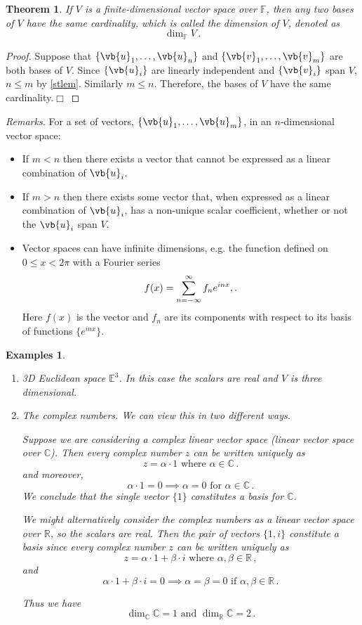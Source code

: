 \documentclass{article}
\theoremstyle{plain}\theoremheaderfont{\normalfont\itshape}\theorembodyfont{\rmfamily}\theoremseparator{.}\newtheorem*{rem}{Remark}\newtheorem*{ex}{Example}\newtheorem*{proof}{Proof}\newtheorem*{altp}{Alternative proof}
\theoremstyle{plain}\theoremheaderfont{\normalfont\bfseries}\theorembodyfont{\rmfamily}\theoremseparator{.}\newtheorem{thm}{Theorem}[section]\newtheorem{lem}[thm]{Lemma}\newtheorem{prop}[thm]{Proposition}\newtheorem*{cor}{Corollary}\newtheorem{defn}[thm]{Definition}\newtheorem{clm}[thm]{Claim}\newtheorem{clminproof}{Claim}
\theoremstyle{break}\theoremheaderfont{\normalfont\itshape}\theorembodyfont{\rmfamily}\theoremseparator{.\medskip}\newtheorem*{proofskip}{Proof}\newtheorem*{exs}{Examples}\newtheorem*{rems}{Remarks}
\theoremstyle{break}\theoremheaderfont{\normalfont\bfseries}\theorembodyfont{\rmfamily}\theoremseparator{.\medskip}\newtheorem{lemskip}[thm]{Lemma}\newtheorem{defnskip}[thm]{Definition}\newtheorem{propskip}[thm]{Proposition}\newtheorem{thmskip}[thm]{Theorem}
\numberwithin{equation}{section}
\newcommand{\qed}{\hfill\ensuremath{\Box}}
\begin{document}
	\begin{thm}
		If \(V\) is a finite-dimensional vector space over \(\mathbb{F}\), then any two bases of \(V\) have the same cardinality, which is called the \textit{dimension} of \(V\), denoted as
		\[\dim_\mathbb{F} V\,.\]
	\end{thm}
	\begin{proof}
		Suppose that \(\{\vb{u}_1,\dots,\vb{u}_n\}\) and \(\{\vb{v}_1,\dots,\vb{v}_m\}\) are both bases of \(V\). Since \(\{\vb{u}_i\}\) are linearly independent and \(\{\vb{v}_i\}\) span \(V\), \(n\le m\) by \cref{stlem}. Similarly \(m\le n\). Therefore, the bases of \(V\) have the same cardinality.\qed
	\end{proof}
	\textit{Remarks.} For a set of vectors, \(\{\vb{u}_1,\dots,\vb{u}_m\}\), in an \(n\)-dimensional vector space:
	\begin{itemize}[topsep=0pt]
		\item If \(m<n\) then there exists a vector that cannot be expressed as a linear combination of \(\vb{u}_i\).
		\item If \(m>n\) then there exists some vector that, when expressed as a linear combination of \(\vb{u}_i\), has a non-unique scalar coefficient, whether or not the \(\vb{u}_i\) span \(V\).
		\item Vector spaces can have infinite dimensions, e.g. the function defined on \(0\le x<2\pi\) with a Fourier series
		\[f(x)=\sum_{n=-\infty}^{\infty}f_n e^{inx}\\,.\]
		Here \(f(x)\) is the vector and \(f_n\) are its components with respect to its basis of functions \(\{e^{inx}\}\).
	\end{itemize}
	
	\begin{exs}
		\begin{enumerate}[topsep=0pt,itemsep=0pt,parsep=1em]
			\item \textit{3D Euclidean space \(\mathbb{E}^3\).} In this case the scalars are real and \(V\) is three dimensional.
			\item \textit{The complex numbers.} We can view this in two different ways.
			
			Suppose we are considering a complex linear vector space (linear vector space over \(\mathbb{C}\)). Then every complex number \(z\) can be written uniquely as
			\[z=\alpha\cdot 1\text{ where }\alpha\in\mathbb{C}\,.\]
			and moreover,
			\[\alpha\cdot 1=0\implies \alpha=0\text{ for }\alpha\in\mathbb{C}\,.\]
			We conclude that the single vector \(\{1\}\) constitutes a basis for \(\mathbb{C}\).
			
			We might alternatively consider the complex numbers as a linear vector space over \(\mathbb{R}\), so the scalars are real. Then the pair of vectors \(\{1,i\}\) constitute a basis since every complex number \(z\) can be written uniquely as
			\[z=\alpha\cdot 1+\beta\cdot i\text{ where }\alpha,\beta\in\mathbb{R}\,,\]
			and 
			\[\alpha\cdot 1+\beta\cdot i=0\implies\alpha=\beta=0\text{ if }\alpha,\beta\in\mathbb{R}\,.\]
			
			Thus we have
			\[\dim_{\mathbb{C}}\mathbb{C}=1\text{ and }\dim_{\mathbb{R}}\mathbb{C}=2\,.\]
		\end{enumerate}
	\end{exs}
	
\end{document}

